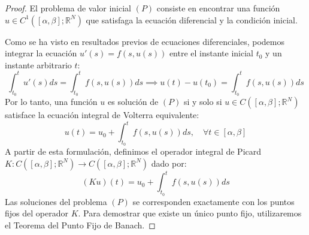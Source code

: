 \begin{proof}
    El problema de valor inicial $(P)$ consiste en encontrar una función $u \in C^1([\alpha, \beta]; \mathbb{R}^N)$ que satisfaga la ecuación diferencial y la condición inicial. 
    
    Como se ha visto en resultados previos de ecuaciones diferenciales, podemos integrar la ecuación $u'(s) = f(s, u(s))$ entre el instante inicial $t_0$ y un instante arbitrario $t$:
    \[
        \int_{t_0}^t u'(s) ds = \int_{t_0}^t f(s, u(s)) ds \implies u(t) - u(t_0) = \int_{t_0}^t f(s, u(s)) ds
    \]
    Por lo tanto, una función $u$ es solución de $(P)$ si y solo si $u \in C([\alpha, \beta]; \mathbb{R}^N)$ satisface la ecuación integral de Volterra equivalente:
    \[
        u(t) = u_0 + \int_{t_0}^t f(s, u(s)) ds, \quad \forall t \in [\alpha, \beta]
    \]
    A partir de esta formulación, definimos el operador integral de Picard $K : C([\alpha, \beta]; \mathbb{R}^N) \to C([\alpha, \beta]; \mathbb{R}^N)$ dado por:
    \[
        (Ku)(t) = u_0 + \int_{t_0}^t f(s, u(s)) ds
    \]
    Las soluciones del problema $(P)$ se corresponden exactamente con los puntos fijos del operador $K$. Para demostrar que existe un único punto fijo, utilizaremos el Teorema del Punto Fijo de Banach. 
    

\end{proof}
